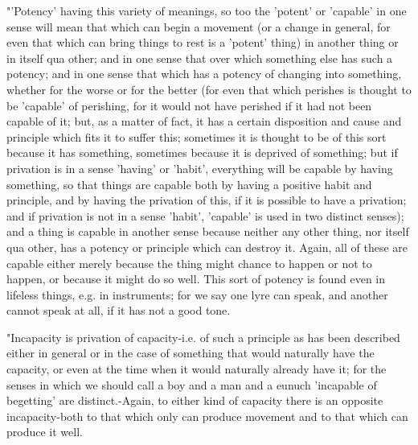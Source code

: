 "'Potency' having this variety of meanings, so too the 'potent' or
'capable' in one sense will mean that which can begin a movement (or
a change in general, for even that which can bring things to rest
is a 'potent' thing) in another thing or in itself qua other; and
in one sense that over which something else has such a potency; and
in one sense that which has a potency of changing into something,
whether for the worse or for the better (for even that which perishes
is thought to be 'capable' of perishing, for it would not have perished
if it had not been capable of it; but, as a matter of fact, it has
a certain disposition and cause and principle which fits it to suffer
this; sometimes it is thought to be of this sort because it has something,
sometimes because it is deprived of something; but if privation is
in a sense 'having' or 'habit', everything will be capable by having
something, so that things are capable both by having a positive habit
and principle, and by having the privation of this, if it is possible
to have a privation; and if privation is not in a sense 'habit', 'capable'
is used in two distinct senses); and a thing is capable in another
sense because neither any other thing, nor itself qua other, has a
potency or principle which can destroy it. Again, all of these are
capable either merely because the thing might chance to happen or
not to happen, or because it might do so well. This sort of potency
is found even in lifeless things, e.g. in instruments; for we say
one lyre can speak, and another cannot speak at all, if it has not
a good tone. 

"Incapacity is privation of capacity-i.e. of such a principle as has
been described either in general or in the case of something that
would naturally have the capacity, or even at the time when it would
naturally already have it; for the senses in which we should call
a boy and a man and a eunuch 'incapable of begetting' are distinct.-Again,
to either kind of capacity there is an opposite incapacity-both to
that which only can produce movement and to that which can produce
it well. 

